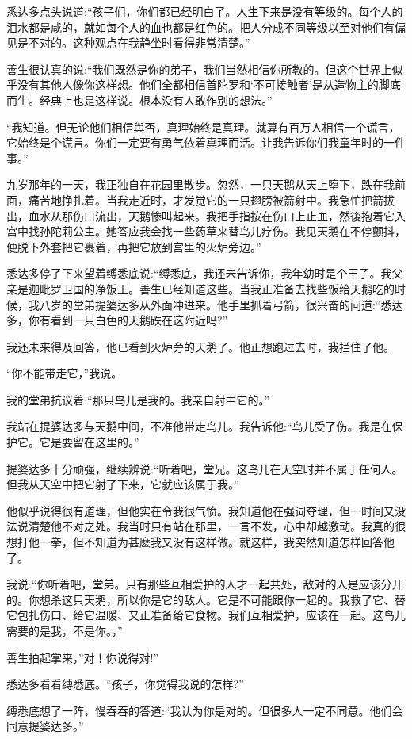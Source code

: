 \documentclass[12pt,twoside,openany]{book}
\begin{document}
悉达多点头说道:“孩子们，你们都已经明白了。人生下来是没有等级的。每个人的泪水都是咸的，就如每个人的血也都是红色的。把人分成不同等级以至对他们有偏见是不对的。这种观点在我静坐时看得非常清楚。”

善生很认真的说:“我们既然是你的弟子，我们当然相信你所教的。但这个世界上似乎没有其他人像你这样想。他们全都相信首陀罗和‘不可接触者’是从造物主的脚底而生。经典上也是这样说。根本没有人敢作别的想法。”

“我知道。但无论他们相信舆否，真理始终是真理。就算有百万人相信一个谎言，它始终是个谎言。你们一定要有勇气依着真理而活。让我告诉你们我童年时的一件事。”

九岁那年的一天，我正独自在花园里散步。忽然，一只天鹅从天上堕下，跌在我前面，痛苦地挣扎着。当我走近时，才发觉它的一只翅膀被箭射中。我急忙把箭拔出，血水从那伤口流出，天鹅惨叫起来。我把手指按在伤口上止血，然後抱着它入宫中找孙陀莉公主。她答应我会找一些药草来替鸟儿疗伤。我见天鹅在不停颤抖，便脱下外套把它裹着，再把它放到宫里的火炉旁边。”

悉达多停了下来望着缚悉底说:“缚悉底，我还未告诉你，我年幼时是个王子。我父亲是迦毗罗卫国的净饭王。善生已经知道这些。当我正准备去找些饭给天鹅吃的时候，我八岁的堂弟提婆达多从外面冲进来。他手里抓着弓箭，很兴奋的问道:“悉达多，你有看到一只白色的天鹅跌在这附近吗?”

我还未来得及回答，他已看到火炉旁的天鹅了。他正想跑过去时，我拦住了他。

“你不能带走它，”我说。

我的堂弟抗议着:“那只鸟儿是我的。我亲自射中它的。”

我站在提婆达多与天鹅中间，不准他带走鸟儿。我告诉他:“鸟儿受了伤。我是在保护它。它是要留在这里的。”

提婆达多十分顽强，继续辨说:“听着吧，堂兄。这鸟儿在天空时并不属于任何人。但我从天空中把它射了下来，它就应该属于我。”

他似乎说得很有道理，但他实在令我很气愤。我知道他在强词夺理，但一时间又没法说清楚他不对之处。我当时只有站在那里，一言不发，心中却越激动。我真的很想打他一拳，但不知道为甚麽我又没有这样做。就这样，我突然知道怎样回答他了。

我说:“你听着吧，堂弟。只有那些互相爱护的人才一起共处，敌对的人是应该分开的。你想杀这只天鹅，所以你是它的敌人。它是不可能跟你一起的。我救了它、替它包扎伤口、给它温暖、又正准备给它食物。我们互相爱护，应该在一起。这鸟儿需要的是我，不是你。，”

善生拍起掌来，”对！你说得对!”

悉达多看看缚悉底。“孩子，你觉得我说的怎样?”

缚悉底想了一阵，慢吞吞的答道:“我认为你是对的。但很多人一定不同意。他们会同意提婆达多。”
\end{document}
